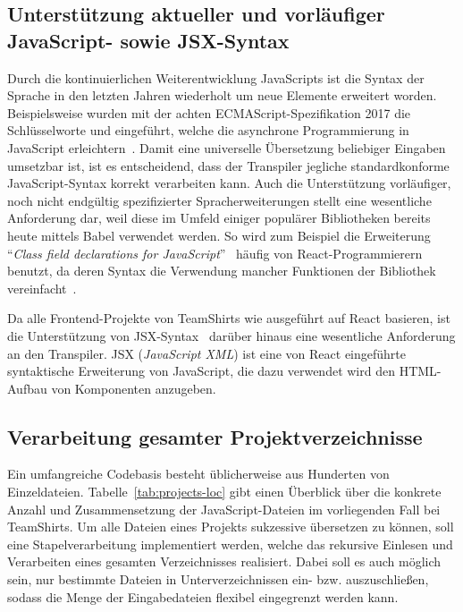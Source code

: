 \subsection{Unterstützung aktueller und vorläufiger JavaScript- sowie JSX-Syntax}
\label{subsec:requirement:syntax}

Durch die kontinuierlichen Weiterentwicklung JavaScripts ist die Syntax der Sprache in den letzten Jahren wiederholt um neue Elemente erweitert worden. Beispielsweise wurden mit der achten ECMAScript-Spezifikation 2017 die Schlüsselworte  und  eingeführt, welche die asynchrone Programmierung in JavaScript erleichtern~\autocite[430]{ECMASCRIPT:2017}. Damit eine universelle Übersetzung beliebiger Eingaben umsetzbar ist, ist es entscheidend, dass der Transpiler jegliche standardkonforme JavaScript-Syntax korrekt verarbeiten kann. Auch die Unterstützung vorläufiger, noch nicht endgültig spezifizierter Spracherweiterungen stellt eine wesentliche Anforderung dar, weil diese im Umfeld einiger populärer Bibliotheken bereits heute mittels Babel verwendet werden. So wird zum Beispiel die Erweiterung \enquote{\textit{Class field declarations for JavaScript}}~\autocite{ES_PROPOSAL:CLASS_FIELDS} häufig von React-Programmierern benutzt, da deren Syntax die Verwendung mancher Funktionen der Bibliothek vereinfacht~\autocite{REACT:HANDLING_EVENTS}.

Da alle Frontend-Projekte von TeamShirts wie ausgeführt auf React basieren, ist die Unterstützung von JSX-Syntax~\autocite{SOFTWARE:JSX} darüber hinaus eine wesentliche Anforderung an den Transpiler. JSX (\textit{JavaScript XML}) ist eine von React eingeführte syntaktische Erweiterung von JavaScript, die dazu verwendet wird den HTML-Aufbau von Komponenten anzugeben.

\subsection{Verarbeitung gesamter Projektverzeichnisse}
\label{subsec:requirement:batch-processing}

Ein umfangreiche Codebasis besteht üblicherweise aus Hunderten von Einzeldateien. Tabelle~\ref{tab:projects-loc} gibt einen Überblick über die konkrete Anzahl und Zusammensetzung der JavaScript-Dateien im vorliegenden Fall bei TeamShirts. Um alle Dateien eines Projekts sukzessive übersetzen zu können, soll eine Stapelverarbeitung implementiert werden, welche das rekursive Einlesen und Verarbeiten eines gesamten Verzeichnisses realisiert. Dabei soll es auch möglich sein, nur bestimmte Dateien in Unterverzeichnissen ein- bzw. auszuschließen, sodass die Menge der Eingabedateien flexibel eingegrenzt werden kann.

